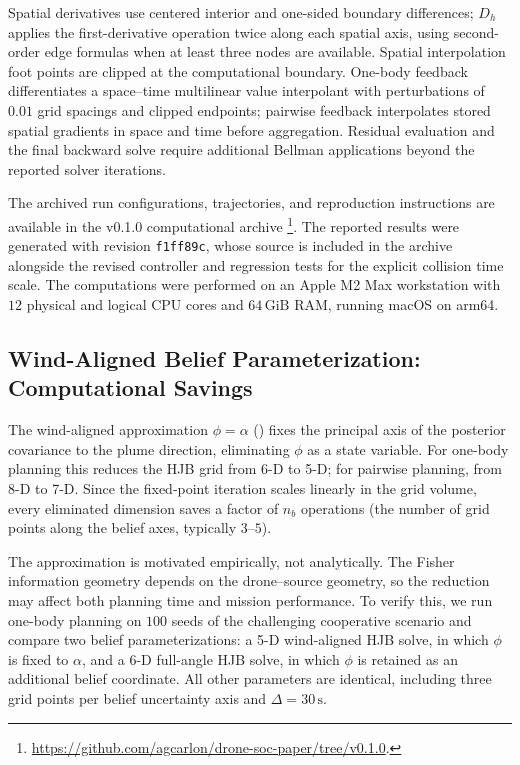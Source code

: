 \documentclass{article}
\begin{document}
Spatial derivatives use centered interior and one-sided boundary differences; $D_h$ applies the first-derivative operation twice along each spatial axis, using second-order edge formulas when at least three nodes are available.
Spatial interpolation foot points are clipped at the computational boundary.
One-body feedback differentiates a space--time multilinear value interpolant with perturbations of $0.01$ grid spacings and clipped endpoints; pairwise feedback interpolates stored spatial gradients in space and time before aggregation.
Residual evaluation and the final backward solve require additional Bellman applications beyond the reported solver iterations.

The archived run configurations, trajectories, and reproduction instructions are available in the v0.1.0 computational archive
\footnote{
\href{https://github.com/agcarlon/drone-soc-paper/tree/v0.1.0}{https://github.com/agcarlon/drone-soc-paper/tree/v0.1.0}.
}.
The reported results were generated with revision \texttt{f1ff89c}, whose source is included in the archive alongside the revised controller and regression tests for the explicit collision time scale.
The computations were performed on an Apple M2 Max workstation with $12$ physical and logical CPU cores and $64\,\mathrm{GiB}$ RAM, running macOS on arm64.

\subsection{Wind-Aligned Belief Parameterization: Computational Savings}
\label{sec:exp_wind_alignment}

The wind-aligned approximation $\phi=\alpha$ () fixes the principal axis of the posterior covariance to the plume direction, eliminating $\phi$ as a state variable.
For one-body planning this reduces the HJB grid from 6-D to 5-D;
for pairwise planning, from 8-D to 7-D.
Since the fixed-point iteration scales linearly in the grid volume, every eliminated dimension saves a factor of $n_b$ operations (the number of grid points along the belief axes, typically $3$--$5$).

The approximation is motivated empirically, not analytically.
The Fisher information geometry depends on the drone--source geometry, so the reduction may affect both planning time and mission performance.
To verify this, we run one-body planning on $100$ seeds of the challenging cooperative scenario and compare two belief parameterizations: a 5-D wind-aligned HJB solve, in which $\phi$ is fixed to $\alpha$, and a 6-D full-angle HJB solve, in which $\phi$ is retained as an additional belief coordinate.
All other parameters are identical, including three grid points per belief uncertainty axis and $\Delta=30\,\mathrm{s}$.
\end{document}
